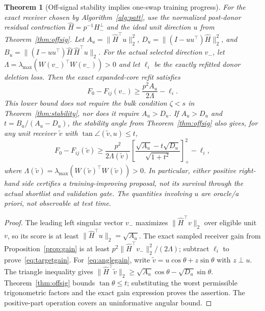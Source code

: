 \documentclass[review,10pt]{elsarticle}
\newtheorem{theorem}{Theorem}
\begin{document}
\begin{theorem}[Off-signal stability implies one-swap training progress]\label{thm:targetprogress}
For the exact receiver chosen by Algorithm~\ref{alg:patt}, use the normalized post-donor residual contraction $\widehat H=p^{-1}H_-^\perp$ and the ideal unit direction $u$ from Theorem~\ref{thm:offsig}. Let $A_u=\|\widehat H^\top u\|_2^2$, $D_u=\|(I-uu^\top)\widehat H\|_2^2$, and $B_u=\|(I-uu^\top)\widehat H\,\widehat H^\top u\|_2$. For the actual selected direction $v_-$, let $\Lambda=\lambda_{\max}(W(v_-)^\top W(v_-))>0$ and let $\ell_i$ be the exactly refitted donor deletion loss. Then the exact expanded-core refit satisfies
\begin{equation}\label{eq:targetgain}
\boxed{F_0-F_{ij}(v_-)\ge \frac{p^2 A_u}{2\Lambda}-\ell_i.}
\end{equation}
This lower bound does \emph{not} require the bulk condition $\zeta<s$ in Theorem~\ref{thm:stability}, nor does it require $A_u>D_u$. If $A_u>D_u$ and $t=B_u/(A_u-D_u)$, the stability angle from Theorem~\ref{thm:offsig} also gives, for any unit receiver $\widetilde v$ with $\tan\angle(\widetilde v,u)\le t$,
\begin{equation}\label{eq:anglegain}
 F_0-F_{ij}(\widetilde v)\ge
 \frac{p^2}{2\Lambda(\widetilde v)}
 \left[\frac{\sqrt{A_u}-t\sqrt{D_u}}{\sqrt{1+t^2}}\right]_+^2-\ell_i,
\end{equation}
where $\Lambda(\widetilde v)=\lambda_{\max}(W(\widetilde v)^\top W(\widetilde v))>0$. In particular, either positive right-hand side certifies a training-improving \emph{proposal}, not its survival through the actual shortlist and validation gate. The quantities involving $u$ are oracle/a priori, not observable at test time.
\end{theorem}
\begin{proof}
The leading left singular vector $v_-$ maximizes $\|\widehat H^\top v\|_2$ over eligible unit $v$, so its score is at least $\|\widehat H^\top u\|_2=\sqrt{A_u}$. The exact sampled receiver gain from Proposition~\ref{prop:gain} is at least $p^2\|\widehat H^\top v_-\|_2^2/(2\Lambda)$; subtract $\ell_i$ to prove~\eqref{eq:targetgain}. For~\eqref{eq:anglegain}, write $\widetilde v=u\cos\theta+z\sin\theta$ with $z\perp u$. The triangle inequality gives $\|\widehat H^\top\widetilde v\|_2\ge\sqrt{A_u}\cos\theta-\sqrt{D_u}\sin\theta$. Theorem~\ref{thm:offsig} bounds $\tan\theta\le t$; substituting the worst permissible trigonometric factors and the exact gain expression proves the assertion. The positive-part operation covers an uninformative angular bound.
\end{proof}
\end{document}
